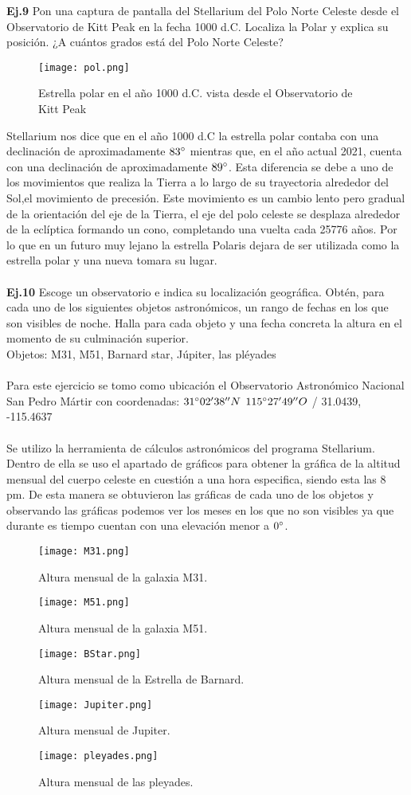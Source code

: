 \documentclass[12pt,letterpaper]{article}
\begin{document}
\textbf{Ej.9} Pon una captura de pantalla del Stellarium del Polo Norte Celeste desde el Observatorio de Kitt Peak en la fecha 1000 d.C. Localiza la Polar y explica su posición. ¿A cuántos grados está del Polo Norte Celeste?
\begin{figure}[H]
\centering
\texttt{[image: pol.png]}
\caption{Estrella polar en el año 1000 d.C. vista desde el Observatorio de Kitt Peak }
\end{figure}
Stellarium nos dice que en el año 1000 d.C la estrella polar contaba con una declinación de aproximadamente $83\degree$ mientras que, en el año actual 2021, cuenta con una declinación de aproximadamente $89\degree$. Esta diferencia se debe a uno de los movimientos que realiza la Tierra a lo largo de su trayectoria alrededor del Sol,el movimiento de precesión. Este movimiento es un cambio lento pero gradual de la orientación del eje de la Tierra, el eje del polo celeste se desplaza alrededor de la eclíptica formando un cono, completando una vuelta cada 25776 años. Por lo que en un futuro muy lejano la estrella Polaris dejara de ser utilizada como la estrella polar y una nueva tomara su lugar.\\\\
\textbf{Ej.10} Escoge un observatorio e indica su localización geográfica. Obtén, para cada uno de los siguientes objetos astronómicos, un rango de fechas en los que son visibles de noche. Halla para cada objeto y una fecha concreta la altura en el momento de su culminación superior.\\
Objetos: M31, M51, Barnard star, Júpiter, las pléyades\\\\
Para este ejercicio se tomo como ubicación el Observatorio Astronómico Nacional San Pedro Mártir con coordenadas: $31{\degree}02'38''N$ $115{\degree}27'49''O$ / 31.0439, -115.4637\\\\
Se utilizo la herramienta de cálculos astronómicos del programa Stellarium. Dentro de ella se uso el apartado de gráficos para obtener la gráfica de la altitud mensual del cuerpo celeste en cuestión a una hora especifica, siendo esta las 8 pm. De esta manera se obtuvieron las gráficas de cada uno de los objetos y observando las gráficas podemos ver los meses en los que no son visibles ya que durante es tiempo cuentan con una elevación menor a $0\degree$.
\begin{figure}[H]
\centering
\texttt{[image: M31.png]}
\caption{Altura mensual de la galaxia M31.}
\vspace{0.3cm}
\texttt{[image: M51.png]}
\caption{Altura mensual de la galaxia M51.}
\end{figure}
\begin{figure}
\texttt{[image: BStar.png]}
\caption{Altura mensual de la Estrella de Barnard.}
\vspace{0.3cm}
\texttt{[image: Jupiter.png]}
\caption{Altura mensual de Jupiter.}
\end{figure}
\begin{figure}
\texttt{[image: pleyades.png]}
\caption{Altura mensual de las pleyades.}
\end{figure}
\end{document}
